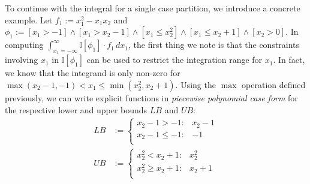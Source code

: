 \documentclass[letterpaper]{article}
\newcommand{\LB}{\mathit{LB}}
\newcommand{\UB}{\mathit{UB}}
\newcommand{\I}{\mathbb{I}}
\begin{document}
To continue with the integral for a single case partition, we
introduce a concrete example.  Let $f_1 := x_1^2 - x_1 x_2$ and $\phi_1
:= [x_1 > -1] \land [x_1 > x_2-1] \land [x_1 \leq x_2^2] \land [x_1 \leq x_2 +1] \land [x_2 > 0]$.  
In computing $\int_{x_1=-\infty}^{\infty} \I[\phi_1] \cdot f_1 \, dx_1$,
the first thing we note is that the constraints involving $x_1$ in
$\I[\phi_1]$ can be used to restrict the integration range for $x_1$.
In fact, we know that the integrand is only non-zero for
$\max(x_2 - 1, -1) < x_1 \leq \min(x_2^2,x_2 + 1)$.  Using the $\max$
operation defined previously, we can 
write explicit functions in 
\emph{piecewise polynomial case form} for the respective 
lower and upper bounds $\LB$ and $\UB$:
\vspace{-2mm}
\begin{align*}
\LB & := \begin{cases}
    x_2 - 1 > -1: & x_2 - 1 \\ 
    x_2 - 1 \leq -1: & -1 \\ 
  \end{cases}\\
\UB & := \begin{cases}
    x_2^2 < x_2 + 1 : & x_2^2 \\ 
    x_2^2 \geq x_2 + 1 : & x_2 + 1 \\ 
  \end{cases}
\end{align*}
\end{document}
